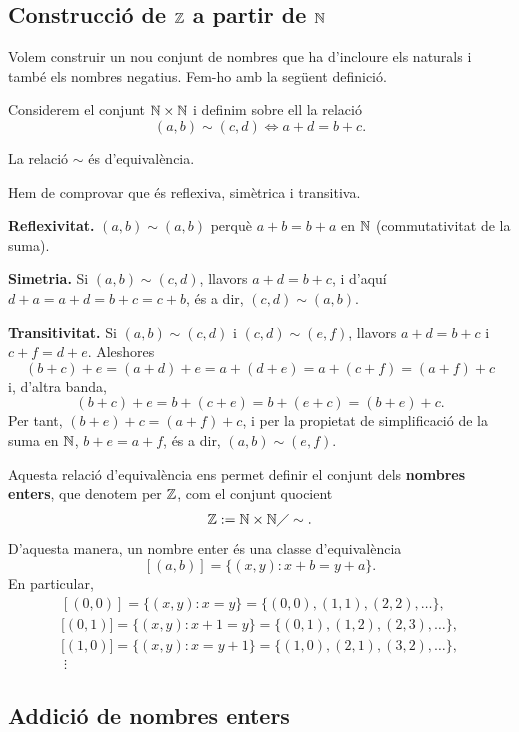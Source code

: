 \subsection{Construcció de \texorpdfstring{$\mathbb{Z}$}{Z} a partir de \texorpdfstring{$\mathbb{N}$}{N}}

Volem construir un nou conjunt de nombres que ha d'incloure els naturals i també els nombres negatius. Fem-ho amb la següent definició.

\begin{definicio}
Considerem el conjunt $\mathbb{N}\times \mathbb{N}$ i definim sobre ell la relació
\[
(a,b)\sim (c,d) \iff a+d=b+c.
\]
\end{definicio}

\begin{proposicio}
La relació $\sim$ és d'equivalència.
\end{proposicio}

\begin{prova}
Hem de comprovar que és reflexiva, simètrica i transitiva.

\textbf{Reflexivitat.} $(a,b)\sim (a,b)$ perquè $a+b=b+a$ en $\mathbb{N}$ (commutativitat de la suma).

\textbf{Simetria.} Si $(a,b)\sim (c,d)$, llavors $a+d=b+c$, i d'aquí $d+a=a+d=b+c=c+b$, és a dir, $(c,d)\sim (a,b)$.

\textbf{Transitivitat.} Si $(a,b)\sim (c,d)$ i $(c,d)\sim (e,f)$, llavors $a+d=b+c$ i $c+f=d+e$. Aleshores
\[
(b+c)+e=(a+d)+e=a+(d+e)=a+(c+f)=(a+f)+c
\]
i, d'altra banda,
\[
(b+c)+e=b+(c+e)=b+(e+c)=(b+e)+c.
\]
Per tant, $(b+e)+c=(a+f)+c$, i per la propietat de simplificació de la suma en $\mathbb{N}$, $b+e=a+f$, és a dir, $(a,b)\sim (e,f)$.
\end{prova}

Aquesta relació d'equivalència ens permet definir el conjunt dels \textbf{nombres enters}, que denotem per $\mathbb{Z}$, com el conjunt quocient
\[
\mathbb{Z}:=\mathbb{N}\times \mathbb{N}\diagup \sim.
\]
D'aquesta manera, un nombre enter és una classe d'equivalència
\[
[(a,b)]=\{(x,y):x+b=y+a\}.
\]
En particular,
\[
\begin{array}{l}
[(0,0)]=\{(x,y):x=y\}=\{(0,0),(1,1),(2,2),\ldots\},\\
\text{[}(0,1)\text{]}=\{(x,y):x+1=y\}=\{(0,1),(1,2),(2,3),\ldots\},\\
\text{[}(1,0)\text{]}=\{(x,y):x=y+1\}=\{(1,0),(2,1),(3,2),\ldots\},\\
\ \vdots
\end{array}
\]

\subsection{Addició de nombres enters}

